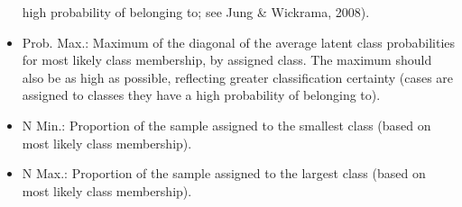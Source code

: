 \documentclass[]{article}
\begin{document}
\begin{itemize}
  high probability of belonging to; see Jung \& Wickrama, 2008).\\
\item
  Prob. Max.: Maximum of the diagonal of the average latent class
  probabilities for most likely class membership, by assigned class. The
  maximum should also be as high as possible, reflecting greater
  classification certainty (cases are assigned to classes they have a
  high probability of belonging to).
\item
  N Min.: Proportion of the sample assigned to the smallest class (based
  on most likely class membership).\\
\item
  N Max.: Proportion of the sample assigned to the largest class (based
  on most likely class membership).
\end{itemize}
\end{document}
